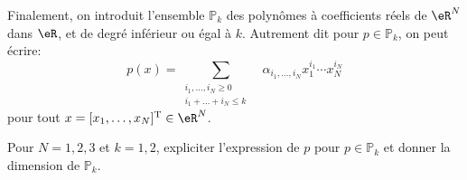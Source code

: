 \medskip

Finalement, on introduit l'ensemble $\mathbb{P}_k$ des polynômes à coefficients réels de $\eR^N$ dans $\eR$, et de degré inférieur ou égal à $k$. Autrement dit pour $p \in \mathbb{P}_k$, on peut écrire:
\[
p(x) = \sum_{\substack{i_1,\ldots,i_N\geq0 \\ i_1+\ldots+i_N\leq k\phantom{-}}} \alpha_{i_1 , \ldots , i_N} x_1^{i_1} \cdots x_N^{i_N}
\]
pour tout $x=[x_1,\ldots,x_N]^\mathrm{T}\in \eR^N$.

\medskip

\begin{exercice}\label{exoChPk_Pk}

Pour $N=1,2,3$ et $k=1,2$, expliciter l'expression de $p$ pour $p\in\mathbb{P}_k$ et donner la dimension de $\mathbb{P}_k$.

\end{exercice}

\medskip

